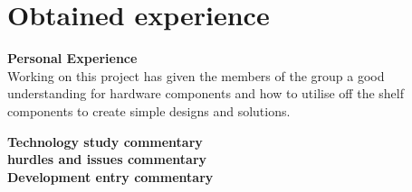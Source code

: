 \chapter{Obtained experience}

\textbf{Personal Experience}\\
Working on this project has given the members of the group a good understanding for hardware components and how to utilise off the shelf components to create simple designs and solutions. 

\textbf{Technology study commentary}\\

\textbf{hurdles and issues commentary}\\

\textbf{Development entry commentary}\\